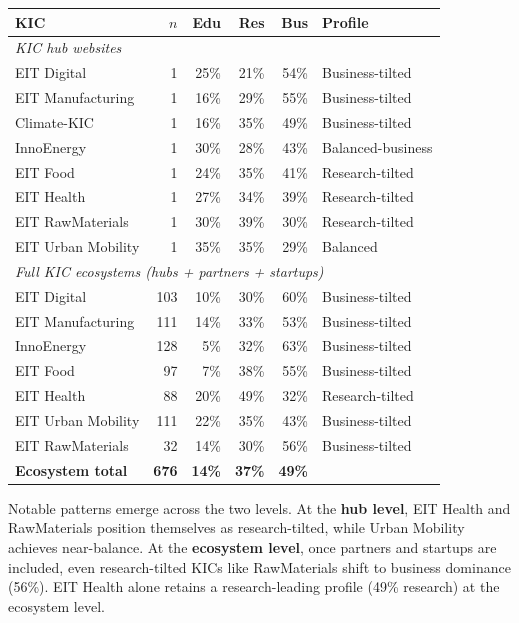 \documentclass[../main.tex]{subfiles}
\begin{document}
\begin{center}
\small
\begin{tabular}{lrrrrl}
\toprule
\textbf{KIC} & \textbf{$n$} & \textbf{Edu} & \textbf{Res} & \textbf{Bus} & \textbf{Profile} \\
\midrule
\multicolumn{6}{l}{\textit{KIC hub websites}} \\
EIT Digital & 1 & 25\% & 21\% & 54\% & Business-tilted \\
EIT Manufacturing & 1 & 16\% & 29\% & 55\% & Business-tilted \\
Climate-KIC & 1 & 16\% & 35\% & 49\% & Business-tilted \\
InnoEnergy & 1 & 30\% & 28\% & 43\% & Balanced-business \\
EIT Food & 1 & 24\% & 35\% & 41\% & Research-tilted \\
EIT Health & 1 & 27\% & 34\% & 39\% & Research-tilted \\
EIT RawMaterials & 1 & 30\% & 39\% & 30\% & Research-tilted \\
EIT Urban Mobility & 1 & 35\% & 35\% & 29\% & Balanced \\
\midrule
\multicolumn{6}{l}{\textit{Full KIC ecosystems (hubs + partners + startups)}} \\
EIT Digital & 103 & 10\% & 30\% & 60\% & Business-tilted \\
EIT Manufacturing & 111 & 14\% & 33\% & 53\% & Business-tilted \\
InnoEnergy & 128 & 5\% & 32\% & 63\% & Business-tilted \\
EIT Food & 97 & 7\% & 38\% & 55\% & Business-tilted \\
EIT Health & 88 & 20\% & 49\% & 32\% & Research-tilted \\
EIT Urban Mobility & 111 & 22\% & 35\% & 43\% & Business-tilted \\
EIT RawMaterials & 32 & 14\% & 30\% & 56\% & Business-tilted \\
\midrule
\textbf{Ecosystem total} & \textbf{676} & \textbf{14\%} & \textbf{37\%} & \textbf{49\%} & \\
\bottomrule
\end{tabular}
\end{center}

Notable patterns emerge across the two levels. At the \textbf{hub level}, EIT Health and RawMaterials position themselves as research-tilted, while Urban Mobility achieves near-balance. At the \textbf{ecosystem level}, once partners and startups are included, even research-tilted KICs like RawMaterials shift to business dominance (56\%). EIT Health alone retains a research-leading profile (49\% research) at the ecosystem level.
\end{document}
